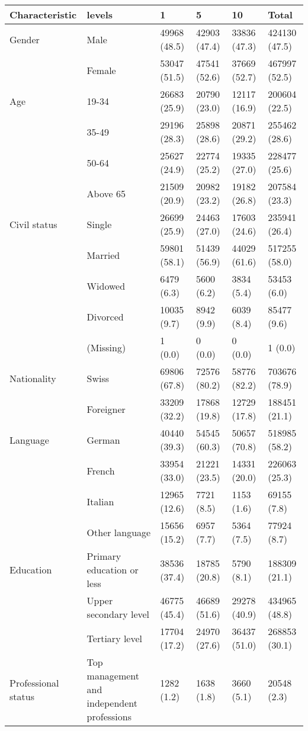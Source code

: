 
\begin{tabular}{llllll}
\toprule
Characteristic & levels & 1 & 5 & 10 & Total\\
\midrule
Gender & Male & 49968 (48.5) & 42903 (47.4) & 33836 (47.3) & 424130 (47.5)\\
 & Female & 53047 (51.5) & 47541 (52.6) & 37669 (52.7) & 467997 (52.5)\\
Age & 19-34 & 26683 (25.9) & 20790 (23.0) & 12117 (16.9) & 200604 (22.5)\\
 & 35-49 & 29196 (28.3) & 25898 (28.6) & 20871 (29.2) & 255462 (28.6)\\
 & 50-64 & 25627 (24.9) & 22774 (25.2) & 19335 (27.0) & 228477 (25.6)\\
 & Above 65 & 21509 (20.9) & 20982 (23.2) & 19182 (26.8) & 207584 (23.3)\\
\addlinespace
Civil status & Single & 26699 (25.9) & 24463 (27.0) & 17603 (24.6) & 235941 (26.4)\\
 & Married & 59801 (58.1) & 51439 (56.9) & 44029 (61.6) & 517255 (58.0)\\
 & Widowed & 6479 (6.3) & 5600 (6.2) & 3834 (5.4) & 53453 (6.0)\\
 & Divorced & 10035 (9.7) & 8942 (9.9) & 6039 (8.4) & 85477 (9.6)\\
 & (Missing) & 1 (0.0) & 0 (0.0) & 0 (0.0) & 1 (0.0)\\
\addlinespace
Nationality & Swiss & 69806 (67.8) & 72576 (80.2) & 58776 (82.2) & 703676 (78.9)\\
 & Foreigner & 33209 (32.2) & 17868 (19.8) & 12729 (17.8) & 188451 (21.1)\\
\addlinespace
Language & German & 40440 (39.3) & 54545 (60.3) & 50657 (70.8) & 518985 (58.2)\\
 & French & 33954 (33.0) & 21221 (23.5) & 14331 (20.0) & 226063 (25.3)\\
 & Italian & 12965 (12.6) & 7721 (8.5) & 1153 (1.6) & 69155 (7.8)\\
 & Other language & 15656 (15.2) & 6957 (7.7) & 5364 (7.5) & 77924 (8.7)\\
\addlinespace
Education & Primary education or less & 38536 (37.4) & 18785 (20.8) & 5790 (8.1) & 188309 (21.1)\\
 & Upper secondary level & 46775 (45.4) & 46689 (51.6) & 29278 (40.9) & 434965 (48.8)\\
 & Tertiary level & 17704 (17.2) & 24970 (27.6) & 36437 (51.0) & 268853 (30.1)\\
\addlinespace
Professional status & Top management and independent professions & 1282 (1.2) & 1638 (1.8) & 3660 (5.1) & 20548 (2.3)\\

\end{tabular}

